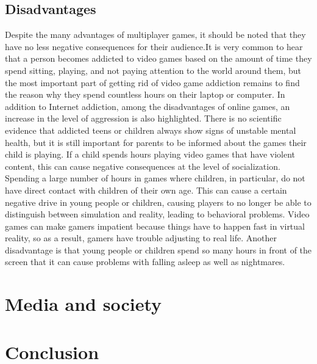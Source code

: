 \documentclass[10pt,twoside,slovak,a4paper]{article}
\begin{document}
\subsection{Disadvantages} \label{ina:este}


  Despite the many advantages of multiplayer games, it should be noted that they have no less negative consequences for their audience.It is very common to hear that a person becomes addicted to video games based on the amount of time they spend sitting, playing, and not paying attention to the world around them, but the most important part of getting rid of video game addiction remains to find the reason why they spend countless hours on their laptop or computer. In addition to Internet addiction, among the disadvantages of online games, an increase in the level of aggression is also highlighted. There is no scientific evidence that addicted teens or children always show signs of unstable mental health, but it is still important for parents to be informed about the games their child is playing. If a child spends hours playing video games that have violent content, this can cause negative consequences at the level of socialization. Spending a large number of hours in games where children, in particular, do not have direct contact with children of their own age. This can cause a certain negative drive in young people or children, causing players to no longer be able to distinguish between simulation and reality, leading to behavioral problems. Video games can make gamers impatient because things have to happen fast in virtual reality, so as a result,  gamers have trouble adjusting to real life. Another disadvantage is that young people or children spend so many hours in front of the screen that it can cause problems with falling asleep as well as nightmares.






\section{Media and society } \label{}




\section{Conclusion} \label{conclusion} 
\end{document}
